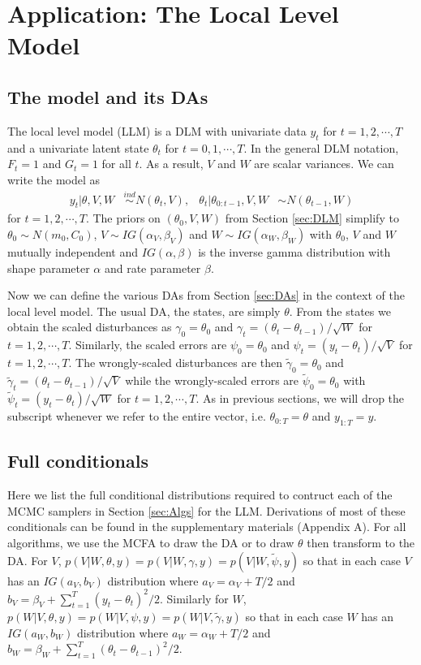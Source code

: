 \documentclass[12pt]{article}
\begin{document}
\section{Application: The Local Level Model}\label{sec:LLM}

\subsection{The model and its DAs}

The local level model (LLM) is a DLM with univariate data $y_t$ for $t=1,2,\cdots,T$ and a univariate latent state $\theta_t$ for $t=0,1,\cdots,T$. In the general DLM notation, $F_t=1$ and $G_t=1$ for all $t$. As a result, $V$ and $W$ are scalar variances. We can write the model as
\begin{align}
  y_t |\theta,V,W& \stackrel{ind}{\sim} N(\theta_t,V), &
  \theta_t |\theta_{0:t-1},V,W& \sim N(\theta_{t-1},W)
\end{align}
for $t=1,2,\cdots,T$. The priors on $(\theta_0,V,W)$ from Section \ref{sec:DLM} simplify to $\theta_0\sim N(m_0,C_0)$, $V\sim IG(\alpha_V,\beta_V)$ and $W\sim IG(\alpha_W,\beta_W)$ with $\theta_0$, $V$ and $W$ mutually independent and $IG(\alpha,\beta)$ is the inverse gamma distribution with shape parameter $\alpha$ and rate parameter $\beta$.

Now we can define the various DAs from Section \ref{sec:DAs} in the context of the local level model. The usual DA, the states, are simply $\theta$. From the states we obtain the scaled disturbances as $\gamma_0=\theta_0$ and $\gamma_t = (\theta_t - \theta_{t-1})/\sqrt{W}$ for $t=1,2,\cdots,T$. Similarly, the scaled errors are $\psi_0=\theta_0$ and $\psi_t = (y_t - \theta_t)/\sqrt{V}$ for $t=1,2,\cdots,T$. The wrongly-scaled disturbances are then $\tilde{\gamma}_{0}=\theta_0$ and $\tilde{\gamma}_t = (\theta_t - \theta_{t-1})/\sqrt{V}$ while the wrongly-scaled errors are $\tilde{\psi}_0=\theta_0$ with $\tilde{\psi}_t = (y_t - \theta_t)/\sqrt{W}$ for $t=1,2,\cdots,T$. As in previous sections, we will drop the subscript whenever we refer to the entire vector, i.e. $\theta_{0:T}=\theta$ and $y_{1:T}=y$.

\subsection{Full conditionals}\label{sec:LLM:fullcond}

Here we list the full conditional distributions required to contruct each of the MCMC samplers in Section \ref{sec:Algs} for the LLM. Derivations of most of these conditionals can be found in the supplementary materials (Appendix A). For all algorithms, we use the MCFA to draw the DA or to draw $\theta$ then transform to the DA. For $V$, $p(V|W,\theta,y)=p(V|W,\gamma,y)=p(V|W,\tilde{\psi},y)$ so that in each case $V$ has an $IG(a_V,b_V)$ distribution where $a_V = \alpha_V + T/2$ and $b_V = \beta_V + \sum_{t=1}^T(y_t - \theta_t)^2/2$. Similarly for $W$, $p(W|V,\theta,y)=p(W|V,\psi,y)=p(W|V,\tilde{\gamma},y)$ so that in each case $W$ has an $IG(a_W, b_W)$ distribution where $a_W = \alpha_W + T/2$ and $b_W = \beta_W + \sum_{t=1}^T(\theta_t - \theta_{t-1})^2/2$.
\end{document}
